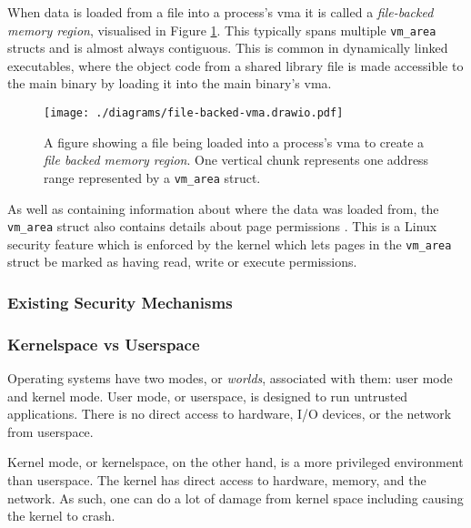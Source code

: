 When data is loaded from a file into a process's \ac{vma} it is called a
\textit{file-backed memory region}, visualised in Figure
\ref{fig:file-backed-vma}. This typically spans multiple
\texttt{vm\_area} structs and is almost always contiguous. This is common in dynamically
linked executables, where the object code from a shared library file is made
accessible to the main binary by loading it into the main binary's \ac{vma}. 

\begin{figure}[ht]
    \centering
    \texttt{[image: ./diagrams/file-backed-vma.drawio.pdf]} 
    \caption{A figure showing a file being loaded into a process's \ac{vma} to
    create a \textit{file backed memory region}. One vertical chunk represents
one address range represented by a \texttt{vm\_area} struct.}
    \label{fig:file-backed-vma}
\end{figure}

As well as containing information about where the data was loaded from, the
\texttt{vm\_area} struct also contains details about page permissions . This is a Linux security feature which is enforced by the
kernel which lets pages in the \texttt{vm\_area} struct be marked as having read,
write or execute permissions.

\subsubsection{Existing Security Mechanisms}

\subsubsection{Kernelspace vs Userspace}
Operating systems have two modes, or \textit{worlds}, associated with them: user
mode and kernel mode. User mode, or userspace, is designed to run untrusted 
applications. There is no direct access to hardware, I/O devices, or the 
network from userspace.

Kernel mode, or kernelspace, on the other hand, is a more privileged environment
than userspace. The kernel has direct access to hardware, memory, and the
network. As such, one can do a lot of damage from kernel space including causing
the kernel to crash.

